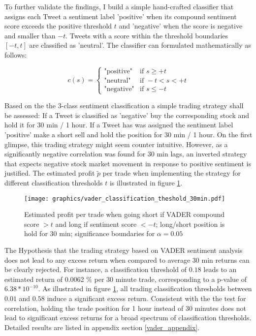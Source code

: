 \documentclass[a4paper,12pt]{article}%
\begin{document}
To further validate the findings, I build a simple hand-crafted classifier that assigns each Tweet a sentiment label 'positive' when its compound sentiment score exceeds the positive threshold $t$ and 'negative' when the score is negative and smaller than $-t$. Tweets with a score within the threshold boundaries $[-t,t]$ are classified as 'neutral'. The classifier can formulated mathematically as follows:

$$ 
 c(s) =
   \begin{cases}
     \text{"positive"} & \text{if } s \geq +t\\
     \text{"neutral"}  & \text{if } -t < s < +t \\
     \text{"negative"}  & \text{if } s \leq -t
   \end{cases}
$$

Based on the the 3-class sentiment classification a simple trading strategy shall be assessed: If a Tweet is classified as 'negative' buy the corresponding stock and hold it for 30 min / 1 hour. If a Tweet has was assigned the sentiment label 'positive' make a short sell and hold the position for 30 min / 1 hour. On the first glimpse, this trading strategy might seem counter intuitive. However, as a significantly negative correlation was found for 30 min lags, an inverted strategy that expects negative stock market movement in response to positive sentiment is justified. The estimated profit $\tilde{p}$ per trade when implementing the strategy for different classification thresholds $t$ is illustrated in figure \ref{fig:vader_class_threshold}. 

\begin{figure}
\captionsetup{justification=centering}
\centering
\texttt{[image: graphics/vader\_classification\_theshold\_30min.pdf]}
\caption{Estimated profit per trade when going short if VADER compound score $>t$ and long if sentiment score $< -t$; long/short position is hold for 30 min; significance boundaries for $\alpha =0.05$  \label{fig:vader_class_threshold}}
\end{figure}

The Hypothesis that the trading strategy based on VADER sentiment analysis does not lead to any excess return when compared to average 30 min returns can be clearly rejected. For instance, a classification threshold of $0.18$ leads to an estimated return of 0.0062 $\%$ per 30 minute trade, corresponding to a p-value of $6.38* 10^{-10}$. As illustrated in figure \ref{fig:vader_class_threshold}, all trading classification thresholds between $0.01$ and $0.58$ induce a significant excess return. Consistent with the the test for correlation, holding the trade position for 1 hour instead of 30 minutes does not lead to significant excess returns for a broad spectrum of classification thresholds. Detailed results are listed in appendix section \ref{vader_appendix}.
\end{document}
